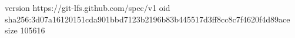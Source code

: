 version https://git-lfs.github.com/spec/v1
oid sha256:3d07a16120151cda901bbd7123b2196b83b445517d3ff8cc8c7f4620f4d89ace
size 105616
